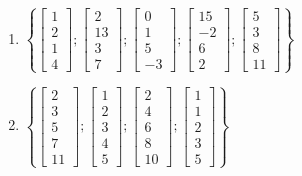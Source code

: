 \begin{enumerate}
\item
$\left\{\left[ \begin{array}{c} 1 \\ 2 \\ 1 \\ 4\end{array} \right] ; 
\left[ \begin{array}{c} 2 \\ 13 \\ 3 \\ 7\end{array} \right] ; 
\left[ \begin{array}{c} 0 \\ 1 \\ 5 \\ -3\end{array} \right] ;
\left[ \begin{array}{c} 15 \\ -2 \\ 6 \\ 2\end{array} \right] ;
\left[ \begin{array}{c} 5 \\ 3 \\ 8 \\ 11\end{array} \right] \right\} $



\item
$\left\{\left[ \begin{array}{c} 2 \\ 3 \\ 5 \\ 7 \\ 11 \end{array} \right] ;
\left[ \begin{array}{c} 1 \\ 2 \\ 3 \\ 4 \\5 \end{array} \right] ;
\left[ \begin{array}{c} 2 \\ 4 \\ 6 \\ 8 \\ 10 \end{array} \right] ; 
\left[ \begin{array}{c} 1 \\ 1 \\ 2 \\ 3 \\ 5 \end{array} \right] \right\} $


\end{enumerate}
